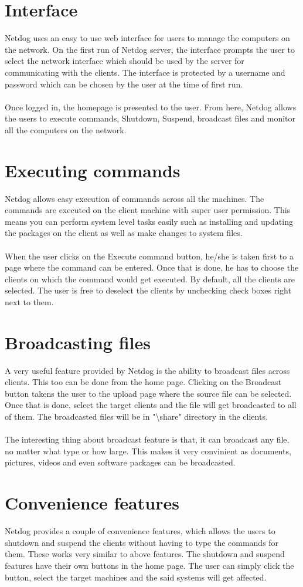 \section{Interface}
Netdog uses an easy to use web interface for users to manage the computers on
the network. On the first run of Netdog server, the interface prompts the user
to select the network interface which should be used by the server for
communicating with the clients. The interface is protected by a username and
password which can be chosen by the user at the time of first run.
\\\\
Once logged in, the homepage is presented to the user. From here, Netdog allows
the users to execute commands, Shutdown, Suspend, broadcast files and monitor
all the computers on the network.

\section{Executing commands}
Netdog allows easy execution of commands across all the machines. The commands
are executed on the client machine with super user permission. This means you
can perform system level tasks easily such as installing and updating the
packages on the client as well as make changes to system files.
\\\\
When the user clicks on the Execute command button, he/she is taken first to a
page where the command can be entered. Once that is done, he has to choose the
clients on which the command would get executed. By default, all the clients
are selected. The user is free to deselect the clients by unchecking check
boxes right next to them.

\section{Broadcasting files}
A very useful feature provided by Netdog is the ability to broadcast files
across clients. This too can be done from the home page. Clicking on the
Broadcast button takens the user to the upload page where the source file can
be selected. Once that is done, select the target clients and the file will get
broadcasted to all of them. The broadcasted files will be in
"\textbackslash share" directory in the clients.
\\\\
The interesting thing about broadcast feature is that, it can broadcast any
file, no matter what type or how large. This makes it very convinient as
documents, pictures, videos and even software packages can be broadcasted.

\section{Convenience features}
Netdog provides a couple of convenience features, which allows the users to
shutdown and suspend the clients without having to type the commands for them.
These works very similar to above features. The shutdown and suspend features
have their own buttons in the home page. The user can simply click the button,
select the target machines and the said systems will get affected.
